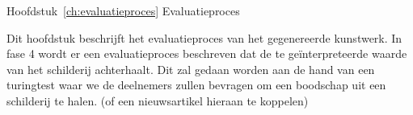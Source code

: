 Hoofdstuk~\ref{ch:evaluatieproces} Evaluatieproces

Dit hoofdstuk beschrijft het evaluatieproces van het gegenereerde kunstwerk. In fase 4 wordt er een evaluatieproces beschreven dat de te geïnterpreteerde waarde van het schilderij achterhaalt. Dit zal gedaan worden aan de hand van een turingtest waar we de deelnemers zullen bevragen om een boodschap uit een schilderij te halen. (of een nieuwsartikel hieraan te koppelen)



